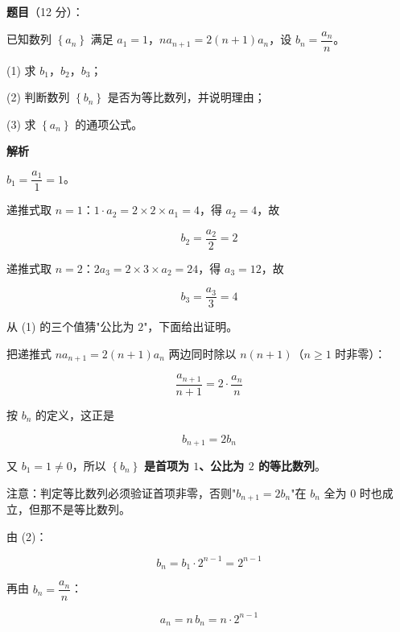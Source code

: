 \begin{answer}

\textbf{题目}（12 分）：

已知数列 $\left\{a_n\right\}$ 满足 $a_1=1$，$na_{n+1}=2(n+1)a_n$，设 $b_n=\dfrac{a_n}n$。

  (1) 求 $b_1$，$b_2$，$b_3$；

  (2) 判断数列 $\left\{b_n\right\}$ 是否为等比数列，并说明理由；

  (3) 求 $\left\{a_n\right\}$ 的通项公式。

\textbf{解析}


$b_1=\dfrac{a_1}1=1$。

递推式取 $n=1$：$1\cdot a_2=2\times2\times a_1=4$，得 $a_2=4$，故

\nopagebreak[4]
\[b_2=\frac{a_2}2=2\]

递推式取 $n=2$：$2a_3=2\times3\times a_2=24$，得 $a_3=12$，故

\nopagebreak[4]
\[b_3=\frac{a_3}3=4\]


从 (1) 的三个值猜"公比为 $2$"，下面给出证明。

把递推式 $na_{n+1}=2(n+1)a_n$ 两边同时除以 $n(n+1)$（$n\ge1$ 时非零）：

\nopagebreak[4]
\[\frac{a_{n+1}}{n+1}=2\cdot\frac{a_n}n\]

按 $b_n$ 的定义，这正是

\nopagebreak[4]
\[b_{n+1}=2b_n\]

又 $b_1=1\ne0$，所以 $\left\{b_n\right\}$ \textbf{是首项为 $1$、公比为 $2$ 的等比数列}。

\begin{gktip}
注意：判定等比数列必须验证首项非零，否则"$b_{n+1}=2b_n$"在 $b_n$ 全为 $0$ 时也成立，但那不是等比数列。
\end{gktip}


由 (2)：

\nopagebreak[4]
\[b_n=b_1\cdot2^{n-1}=2^{n-1}\]

再由 $b_n=\dfrac{a_n}n$：

\nopagebreak[4]
\[a_n=n\,b_n=n\cdot2^{n-1}\]


\end{answer}
